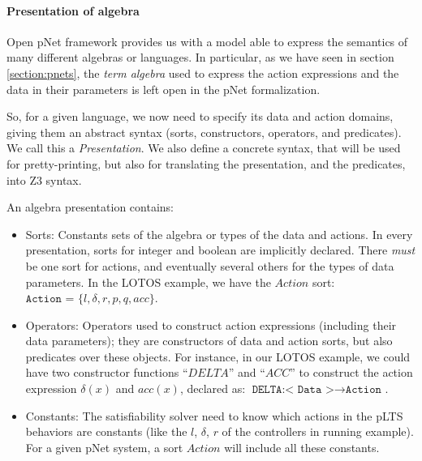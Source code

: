 \documentclass{lncs/llncs}
\newcommand{\OTvar}{\texttt}
\newcommand{\QIN}[1]{\textcolor{airforceblue}{#1}}
\begin{document}

\paragraph{Presentation of algebra}
\QIN{
Open pNet framework provides us
with a model able to express the semantics of many different algebras
or languages. In particular, as we have seen in section
\ref{section:pnets}, the \emph{term algebra} used to express the
action expressions and the data in their parameters is left open in
the pNet formalization.
}

\QIN{
So, for a given language, we now need to specify its data and action
domains, giving them an abstract syntax (sorts, constructors, operators,
and predicates). We call this a \emph{Presentation}.
We also define a concrete syntax, that will be used for
pretty-printing, but also for translating the presentation, and the
predicates, into Z3 syntax.
}

\QIN{
An algebra presentation contains:
}

\begin{itemize}
	\item Sorts: Constants sets of the algebra or types of the data
          and actions. In every presentation, sorts for integer and
          boolean are implicitly declared.  There \emph{must} be one sort for actions, and eventually 
several others for the types of data parameters. In the LOTOS example,
we have the $Action$ sort: $\OTvar{Action = } \{ l, \delta, r, p, q, acc \} .$

	\item Operators: Operators used to construct action
          expressions (including their data parameters); they are
          constructors of data and action sorts, but also predicates
          over these objects. For instance, in our LOTOS example, we
          could have two constructor functions ``$DELTA$'' and ``$ACC$''
          to construct the action expression $\delta(x)$ and $acc(x)$, declared as:
          $\OTvar{DELTA:}\OTvar{< Data >} \rightarrow \OTvar{Action .}$
        \item Constants: The satisfiability solver need to know which
          actions in the pLTS behaviors are constants (like the $l$, $\delta$, 
          $r$ of the controllers in running example). 
          For a given pNet system, a sort $Action$ will include all
          these constants.
\end{itemize}
\end{document}
